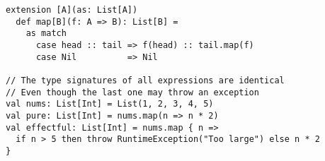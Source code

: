 \begin{algorithm}

\begin{verbatim}
extension [A](as: List[A])
  def map[B](f: A => B): List[B] =
    as match
      case head :: tail => f(head) :: tail.map(f)
      case Nil          => Nil

// The type signatures of all expressions are identical
// Even though the last one may throw an exception
val nums: List[Int] = List(1, 2, 3, 4, 5)
val pure: List[Int] = nums.map(n => n * 2)
val effectful: List[Int] = nums.map { n =>
  if n > 5 then throw RuntimeException("Too large") else n * 2
}
\end{verbatim}

\caption{ function in Scala, where  can have arbitrary side effects.%
\label{unrestricted-effs}}
\end{algorithm}